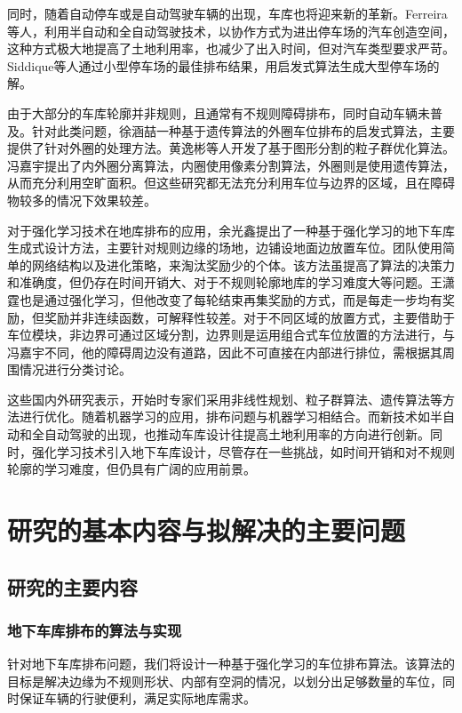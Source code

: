 同时，随着自动停车或是自动驾驶车辆的出现，车库也将迎来新的革新。Ferreira\cite{ferreira2014self}等人，利用半自动和全自动驾驶技术，以协作方式为进出停车场的汽车创造空间，这种方式极大地提高了土地利用率，也减少了出入时间，但对汽车类型要求严苛。Siddique\cite{siddique2021puzzle}等人通过小型停车场的最佳排布结果，用启发式算法生成大型停车场的解。

由于大部分的车库轮廓并非规则，且通常有不规则障碍排布，同时自动车辆未普及。针对此类问题，徐涵喆\cite{1020726891.nh}一种基于遗传算法的外圈车位排布的启发式算法，主要提供了针对外圈的处理方法。黄逸彬等人\cite{BJYD202004002}开发了基于图形分割的粒子群优化算法。冯嘉宇\cite{1022674189.nh}提出了内外圈分离算法，内圈使用像素分割算法，外圈则是使用遗传算法，从而充分利用空旷面积。但这些研究都无法充分利用车位与边界的区域，且在障碍物较多的情况下效果较差。

对于强化学习技术在地库排布的应用，余光鑫\cite{1020332216.nh}提出了一种基于强化学习的地下车库生成式设计方法，主要针对规则边缘的场地，边铺设地面边放置车位。团队使用简单的网络结构以及进化策略，来淘汰奖励少的个体。该方法虽提高了算法的决策力和准确度，但仍存在时间开销大、对于不规则轮廓地库的学习难度大等问题。王潇霆\cite{1023719817.nh}也是通过强化学习，但他改变了每轮结束再集奖励的方式，而是每走一步均有奖励，但奖励并非连续函数，可解释性较差。对于不同区域的放置方式，主要借助于车位模块，非边界可通过区域分割，边界则是运用组合式车位放置的方法进行，与冯嘉宇不同，他的障碍周边没有道路，因此不可直接在内部进行排位，需根据其周围情况进行分类讨论。

这些国内外研究表示，开始时专家们采用非线性规划、粒子群算法、遗传算法等方法进行优化。随着机器学习的应用，排布问题与机器学习相结合。而新技术如半自动和全自动驾驶的出现，也推动车库设计往提高土地利用率的方向进行创新。同时，强化学习技术引入地下车库设计，尽管存在一些挑战，如时间开销和对不规则轮廓的学习难度，但仍具有广阔的应用前景。
\section{研究的基本内容与拟解决的主要问题}
\subsection{研究的主要内容}
\subsubsection{地下车库排布的算法与实现}
针对地下车库排布问题，我们将设计一种基于强化学习的车位排布算法。该算法的目标是解决边缘为不规则形状、内部有空洞的情况，以划分出足够数量的车位，同时保证车辆的行驶便利，满足实际地库需求。

